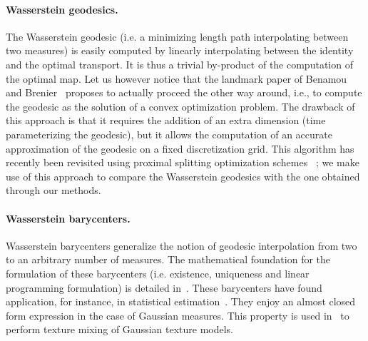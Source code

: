 

\paragraph{Wasserstein geodesics. }

The Wasserstein geodesic (i.e. a minimizing length path interpolating between two measures) is easily computed by linearly interpolating between the identity and the optimal transport. It is thus a trivial by-product of the computation of the optimal map. Let us however notice that the landmark paper of Benamou and Brenier~\cite{Benamou2000} proposes to actually proceed the other way around, i.e., to compute the geodesic as the solution of a convex optimization problem. The drawback of this approach is that it requires the addition of an extra dimension (time parameterizing the geodesic), but it allows the computation of an accurate approximation of the geodesic on a fixed discretization grid. This algorithm has recently been revisited using proximal splitting optimization schemes~\cite{FPapPeyOud13} ; we make use of this approach to compare the Wasserstein geodesics with the one obtained through our methods. 

\paragraph{Wasserstein barycenters. }

Wasserstein barycenters generalize the notion of geodesic interpolation from two to an arbitrary number of measures. The mathematical foundation for the formulation of these barycenters (i.e. existence, uniqueness and linear programming formulation) is detailed in~\cite{Carlier_wasserstein_barycenter}. These barycenters have found application, for instance, in statistical estimation~\cite{BigotBarycenter}. They enjoy an almost closed form expression in the case of Gaussian measures. This property is used in~\cite{peyre2013Gaussians} to perform texture mixing of Gaussian texture models. 

